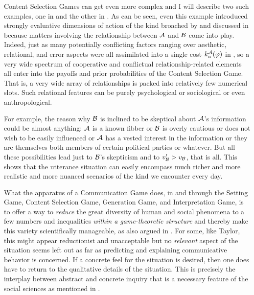 Content Selection Games can get even more complex and I will describe two such examples, one in  and the other in . As can be seen, even this example introduced strongly evaluative dimensions of action of the kind broached by \citet{taylor:halpp} and discussed in  because matters involving the relationship between $\cal A$ and $\cal B$ come into play. Indeed, just as many potentially conflicting factors ranging over aesthetic, relational, and error aspects were all assimilated into a single cost $k^{\cal A}_u(\varphi)$ in , so a very wide spectrum of cooperative and conflictual relationship-related elements all enter into the payoffs and prior probabilities of the Content Selection Game. That is, a very wide array of relationships is packed into relatively few numerical slots. Such relational features can be purely psychological or sociological or even anthropological.

For example, the reason why $\cal B$ is inclined to be skeptical about $\cal A$'s information could be almost anything: $\cal A$ is a known fibber or $\cal B$ is overly cautious or does not wish to be easily influenced or $\cal A$ has a vested interest in the information or they are themselves both members of certain political parties or whatever. But all these possibilities lead just to $\cal B$'s skepticism and to $v'_{\cal B} > v_{\cal B}$, that is all. This shows that the utterance situation can easily encompass much richer and more realistic and more nuanced scenarios of the kind we encounter every day.

What the apparatus of a Communication Game does, in and through the Setting Game, Content Selection Game, Generation Game, and Interpretation Game, is to offer a way to \emph{reduce} the great diversity of human and social phenomena to a few numbers and inequalities \emph{within a game-theoretic structure} and thereby make this variety scientifically manageable, as also argued in . For some, like Taylor, this might appear reductionist and unacceptable but no \emph{relevant} aspect of the situation seems left out as far as predicting and explaining communicative behavior is concerned. If a concrete feel for the situation is desired, then one does have to return to the qualitative details of the situation. This is precisely the interplay between abstract and concrete inquiry that is a necessary feature of the social sciences as mentioned in .
